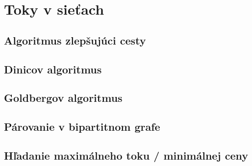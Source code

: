 \documentclass[../main.tex]{subfiles}
\begin{document}
\section{Toky v sieťach}
\subsection{Algoritmus zlepšujúci cesty}
\subsection{Dinicov algoritmus}
\subsection{Goldbergov algoritmus}
\subsection{Párovanie v bipartitnom grafe}
\subsection{Hľadanie maximálneho toku / minimálnej ceny}
\end{document}
